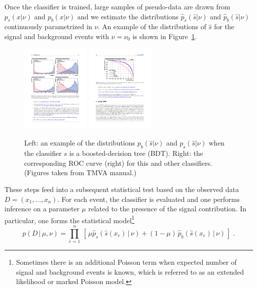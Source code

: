 \documentclass[aoas,preprint]{imsart}
\numberwithin{equation}{section}
\theoremstyle{plain}
\begin{document}
 Once the classifier is trained, large samples of pseudo-data are drawn from $p_s(x | \nu)$ and $p_b(x | \nu)$ and we estimate the distributions  $\hat{p}_s(\hat s | \nu)$ and $\hat{p}_b(\hat s | \nu)$ continuously parametrized in $\nu$. 
An example of the distributions of $\hat s$ for the signal and background events with $\nu=\nu_0$ is shown in Figure~\ref{fig:tmva}.


\begin{figure}[htbp]
\begin{center}
 \includegraphics[height=1.7in]{example-TMVA-BDT.pdf}
 \includegraphics[height=1.7in]{example-TMVA-ROC.pdf}
\caption{Left: an example of the distributions $p_b(\hat s|\nu)$ and $p_s(\hat s|\nu)$ when the classifier $s$ is a boosted-decision tree (BDT). Right: the corresponding ROC curve (right) for this and other classifiers. (Figures taken from TMVA manual.)}
\label{fig:tmva}
\end{center}
\end{figure}

These steps feed into a subsequent statistical test based on the observed data 
${D=(x_1, \dots, x_n)}$. For each event, the classifier is evaluated and one performs inference on a parameter $\mu$ related to the presence of the signal contribution. In particular, one forms the statistical model\footnote{Sometimes there is an additional Poisson term when expected number of signal and background events is known, which is referred to as an extended likelihood or marked Poisson model.} 
\begin{equation}\label{eq:typicalML}
p( D \,|\, \mu, \nu) = \prod_{e=1}^n \, \left[\, \mu \hat{p}_s( \hat s(x_e) \, |\,  \nu)  + (1-\mu)\, \hat{p}_b( \hat s(x_e) \,|\, \nu) \,\right] \; .
\end{equation}
\end{document}
